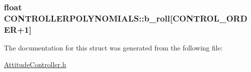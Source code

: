 \subsubsection[{\texorpdfstring{b\+\_\+roll}{b_roll}}]{\setlength{\rightskip}{0pt plus 5cm}float C\+O\+N\+T\+R\+O\+L\+L\+E\+R\+P\+O\+L\+Y\+N\+O\+M\+I\+A\+L\+S\+::b\+\_\+roll\mbox{[}{\bf C\+O\+N\+T\+R\+O\+L\+\_\+\+O\+R\+D\+ER}+1\mbox{]}}\hypertarget{struct_c_o_n_t_r_o_l_l_e_r_p_o_l_y_n_o_m_i_a_l_s_a0f00d49108517a7db4edcccf44c59282}{}\label{struct_c_o_n_t_r_o_l_l_e_r_p_o_l_y_n_o_m_i_a_l_s_a0f00d49108517a7db4edcccf44c59282}


The documentation for this struct was generated from the following file\+:\begin{DoxyCompactItemize}
\item 
\hyperlink{_attitude_controller_8h}{Attitude\+Controller.\+h}\end{DoxyCompactItemize}
